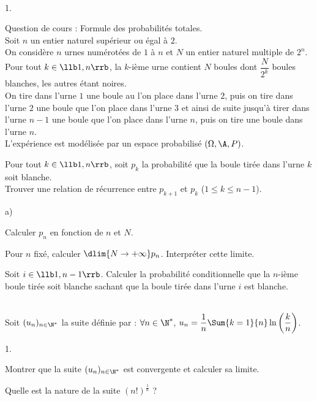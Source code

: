 \documentclass[11pt]{article}%
\begin{document}
\begin{exerciceAP}~
  \begin{noliste}{1.}
    \setlength{\itemsep}{2mm}
  \item Question de cours : Formule des probabilités totales.\\
    Soit $n$ un entier naturel supérieur ou égal à $2$.\\
    On considère $n$ urnes numérotées de $1$ à $n$ et $N$ un entier
    naturel multiple de $2^n$.\\
    Pour tout $k\in\llb 1,n\rrb$, la $k$-ième urne contient $N$ boules
    dont $\dfrac{N}{2^k}$ boules blanches, les autres étant noires.\\
    On tire dans l'urne $1$ une boule au l'on place dans l'urne $2$,
    puis on tire dans l'urne $2$ une boule que l'on place dans l'urne
    $3$ et ainsi de suite jusqu'à tirer dans l'urne $n-1$ une boule
    que l'on place dans l'urne $n$, puis on tire une boule dans l'urne
    $n$.\\
    L'expérience est modélisée par un espace probabilisé
    $(\Omega,\A,P)$.
  \item Pour tout $k\in\llb 1,n\rrb$, soit $p_k$ la probabilité que la
    boule tirée dans l'urne $k$ soit blanche.\\
    Trouver une relation de récurrence entre $p_{k+1}$ et $p_k$
    ($1\leq k\leq n-1$).
  \item 
    \begin{noliste}{a)}
    \setlength{\itemsep}{2mm}
    \item Calculer $p_n$ en fonction de $n$ et $N$.
    \item Pour $n$ fixé, calculer $\dlim{N\to+\infty}
      p_n$. Interpréter cette limite.
    \end{noliste}
  \item Soit $i\in\llb 1,n-1\rrb$. Calculer la probabilité
    conditionnelle que la $n$-ième boule tirée soit blanche sachant
    que la boule tirée dans l'urne $i$ est blanche.
  \end{noliste}
\end{exerciceAP}


\begin{exerciceSP}~\\
  Soit $(u_n)_{n\in\N^*}$ la suite définie par : $\forall n\in\N^*$,
  $u_n=\dfrac{1}{n}\Sum{k=1}{n} \ln\left(\dfrac{k}{n}\right)$.
  \begin{noliste}{1.}
    \setlength{\itemsep}{2mm}
  \item Montrer que la suite $(u_n)_{n\in\N^*}$ est convergente et
    calculer sa limite.
  \item Quelle est la nature de la suite $(n!)^{\frac{1}{n}}$ ?
  \end{noliste}
\end{exerciceSP}
\end{document}
